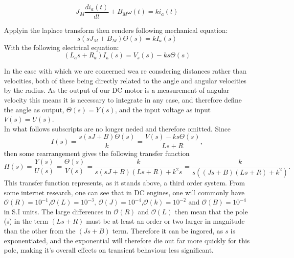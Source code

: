 \documentclass[a4paper,onecolumn,amsmath,amssymb]{revtex4-1}
\begin{document}
\begin{equation}
J_M\frac{d i_a(t)}{dt}+B_M\omega(t) =k i_a (t)
\end{equation}

Applyin the laplace transform then renders following mechanical equation:\\
\begin{equation}
 s \left( s J_M + B_M\right)\Theta (s)=k I_a(s)
\end{equation}
With the following electrical equation:\\
\begin{equation}
\left( L_a s+R_a\right)I_a(s)=V_s(s) - k s \Theta(s)
\end{equation}

In the case with which we are concerned wea re consdering distances rather than velocities, both of these being directly related to the angle and angular velocities by the radius. As the output of our DC motor is a measurement of angular velocity this means it is necessary to integrate in any case, and therefore define the angle as output, $\Theta(s)=Y(s)$, and the input voltage as input $V(s)=U(s)$.\\

In what follows subscripts are no longer neded and therefore omitted. Since \\
\begin{equation}
I(s)=\frac{s\left(sJ+B\right)\Theta(s)}{k}=\frac{V(s)-ks\Theta(s)}{L s +R},
\end{equation}
then some rearrangement gives the following transfer function
\begin{equation}
H(s)=\frac{Y(s)}{U(s)}=\frac{\Theta(s)}{V(s)}=\frac{k}{s(sJ+B)(Ls+R)+k^2s}=\frac{k}{s\left((Js+B)(Ls+R)+k^2\right)}.
\end{equation}
This transfer function represents, as it stands above, a third order system. From some internet research, one can see that in DC engines, one will commonly have $\mathcal{O}(R)=10^{-1}$,$\mathcal{O}(L)=10^{-3}$, $\mathcal{O}(J)=10^{-4}$,$\mathcal{O}(k)=10^{-2}$ and $\mathcal{O}(B)=10^{-4}$ in S.I units. The large differences in $\mathcal{O}(R)$ and $\mathcal{O}(L)$ then mean that the pole (s) in the term $(Ls+R)$ must be at least an order or two larger in magnitude than the other from the $(Js+B)$ term. Therefore it can be ingored, as $s$ is exponentiated, and the exponential will therefore die out far more quickly for this pole, making it's overall effects on transient behaviour less significant.\\
\end{document}
